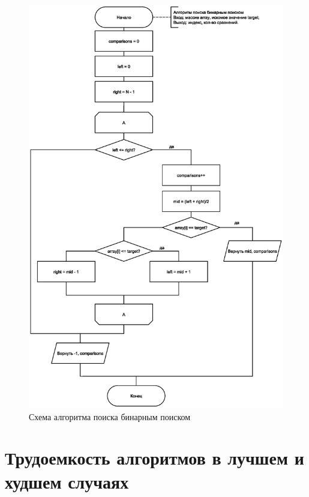 \clearpage

\begin{figure}[h]
	\centering
	\includegraphics[scale=0.7]{img/binsearch.eps}
	\caption{Схема алгоритма поиска бинарным поиском}
	\label{fig:bin_search}
\end{figure}

\clearpage

\section{Трудоемкость алгоритмов в лучшем и худшем случаях}

